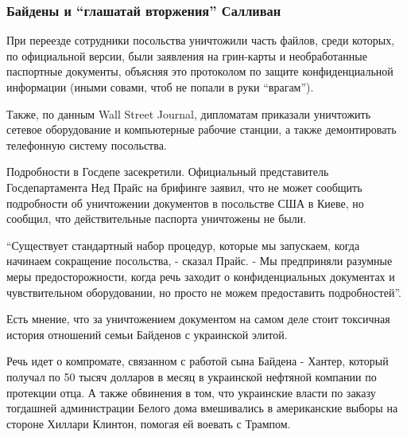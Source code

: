  
 
 
 
 

\subsubsection{Байдены и \enquote{глашатай вторжения} Салливан}
\label{sec:18_02_2022.stz.news.ua.strana.1.dokumenty_usa_posolstvo_kiev.1.bajdeny_sallivan}

При переезде сотрудники посольства уничтожили часть файлов, среди которых, по
официальной версии, были заявления на грин-карты и необработанные паспортные
документы, объясняя это протоколом по защите конфиденциальной информации (иными
совами, чтоб не попали в руки \enquote{врагам}).

Также, по данным Wall Street Journal, дипломатам приказали уничтожить сетевое
оборудование и компьютерные рабочие станции, а также демонтировать телефонную
систему посольства.

Подробности в Госдепе засекретили. Официальный представитель Госдепартамента
Нед Прайс на брифинге заявил, что не может сообщить подробности об уничтожении
документов в посольстве США в Киеве, но сообщил, что действительные паспорта
уничтожены не были.

\enquote{Существует стандартный набор процедур, которые мы запускаем, когда начинаем
сокращение посольства, - сказал Прайс. - Мы предприняли разумные меры
предосторожности, когда речь заходит о конфиденциальных документах и
чувствительном оборудовании, но просто не можем предоставить
подробностей}.

Есть мнение, что за уничтожением документом на самом деле стоит токсичная
история отношений семьи Байденов с украинской элитой.

Речь идет о компромате, связанном с работой сына Байдена - Хантер, который
получал по 50 тысяч долларов в месяц в украинской нефтяной компании по
протекции отца. А также обвинения в том, что украинские власти по заказу
тогдашней администрации Белого дома вмешивались в американские выборы на
стороне Хиллари Клинтон, помогая ей воевать с Трампом.

